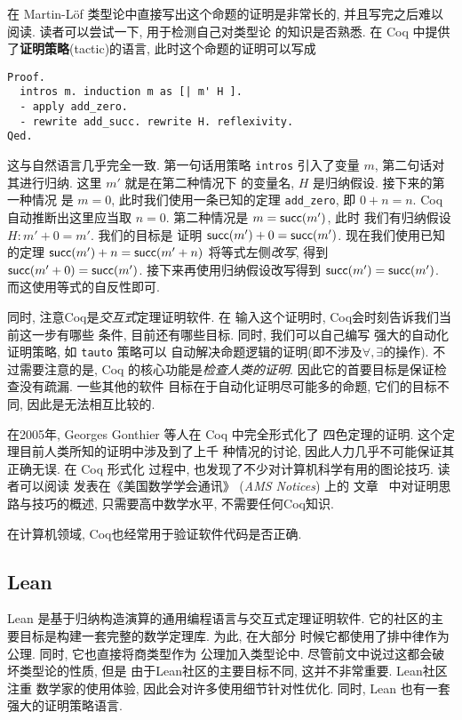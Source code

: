 在 Martin-L\"of 类型论中直接写出这个命题的证明是非常长的,
并且写完之后难以阅读. 读者可以尝试一下, 用于检测自己对类型论
的知识是否熟悉. 在 Coq 中提供了\textbf{证明策略}(tactic)的语言,
此时这个命题的证明可以写成
\begin{verbatim}
Proof.
  intros m. induction m as [| m' H ].
  - apply add_zero.
  - rewrite add_succ. rewrite H. reflexivity.
Qed.
\end{verbatim}
这与自然语言几乎完全一致. 第一句话用策略 \texttt{intros}
引入了变量 \(m\), 第二句话对其进行归纳.
这里 \(m'\) 就是在第二种情况下
的变量名, \(H\) 是归纳假设. 接下来的第一种情况
是 \(m = 0\), 此时我们使用一条已知的定理 \texttt{add\_zero},
即 \(0 + n = n\). Coq 自动推断出这里应当取 \(n = 0\).
第二种情况是 \(m = \textsf{succ}(m')\), 此时
我们有归纳假设 \(H : m' + 0 = m'\). 我们的目标是
证明 \(\textsf{succ}(m') + 0 = \textsf{succ}(m')\).
现在我们使用已知的定理 \(\textsf{succ}(m') + n = \textsf{succ}(m'+n)\)
将等式左侧\emph{改写}, 得到
\(\textsf{succ}(m' + 0) = \textsf{succ}(m')\).
接下来再使用归纳假设改写得到 \(\textsf{succ}(m') = \textsf{succ}(m')\).
而这使用等式的自反性即可.

同时, 注意Coq是\emph{交互式}定理证明软件. 在
输入这个证明时, Coq会时刻告诉我们当前这一步有哪些
条件, 目前还有哪些目标. 同时, 我们可以自己编写
强大的自动化证明策略, 如 \texttt{tauto} 策略可以
自动解决命题逻辑的证明(即不涉及\(\forall, \exists\)的操作).
不过需要注意的是, Coq 的核心功能是\emph{检查人类的证明}.
因此它的首要目标是保证检查没有疏漏. 一些其他的软件
目标在于自动化证明尽可能多的命题, 它们的目标不同,
因此是无法相互比较的.

在2005年, Georges Gonthier 等人在 Coq 中完全形式化了
四色定理的证明. 这个定理目前人类所知的证明中涉及到了上千
种情况的讨论, 因此人力几乎不可能保证其正确无误. 在 Coq 形式化
过程中, 也发现了不少对计算机科学有用的图论技巧. 读者可以阅读
发表在《美国数学学会通讯》 (\emph{AMS Notices}) 上的
文章~\cite{gonthier:2008:fourcolor} 中对证明思路与技巧的概述,
只需要高中数学水平, 不需要任何Coq知识.

在计算机领域, Coq也经常用于验证软件代码是否正确. %

\subsection{Lean}

Lean 是基于归纳构造演算的通用编程语言与交互式定理证明软件.
它的社区的主要目标是构建一套完整的数学定理库. 为此, 在大部分
时候它都使用了排中律作为公理. 同时, 它也直接将商类型作为
公理加入类型论中. 尽管前文中说过这都会破坏类型论的性质, 但是
由于Lean社区的主要目标不同, 这并不非常重要. Lean社区注重
数学家的使用体验, 因此会对许多使用细节针对性优化. 同时, Lean 也有一套
强大的证明策略语言.


